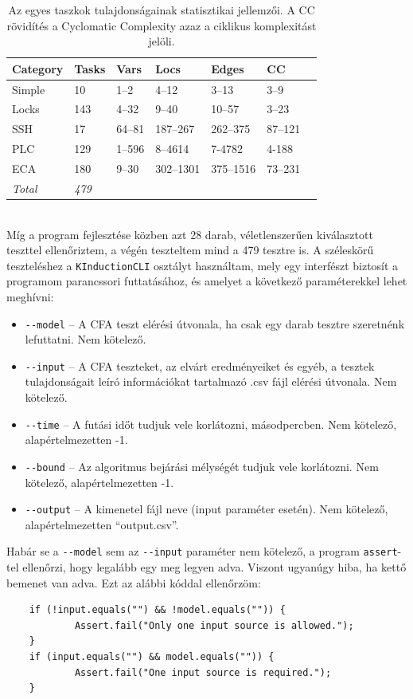 \begin{table}[h] 
	\centering
	\begin{tabular}{lllllll}
		\toprule
		Category & Tasks & Vars & Locs & Edges & CC\\
		\midrule
		Simple & 10 & 1--2 & 4--12 & 3--13 & 3--9\\
		Locks & 143 & 4--32 & 9--40 & 10--57 & 3--23\\
		SSH & 17 & 64--81 & 187--267 & 262--375 & 87--121\\
		PLC & 129 & 1--596 & 8--4614 & 7-4782 & 4-188\\
		ECA & 180 & 9--30 & 302--1301 & 375--1516 & 73--231\\
		
		\bottomrule
		\textit{Total} & \textit{479}\\
	\end{tabular}
	\caption{Az egyes taszkok tulajdonságainak statisztikai jellemzői. A CC rövidítés a Cyclomatic Complexity azaz a ciklikus komplexitást jelöli.}
	\label{table:tasksStat}
\end{table}
\ \\
Míg a program fejlesztése közben azt 28 darab, véletlenszerűen kiválasztott teszttel ellenőriztem, a végén teszteltem mind a 479 tesztre is. A széleskörű teszteléshez a \texttt{KInductionCLI} osztályt használtam, mely egy interfészt biztosít a programom parancssori futtatásához, és amelyet a következő paraméterekkel lehet meghívni:

\begin{itemize}
	\item \texttt{-{}-model} -- A CFA teszt elérési útvonala, ha csak egy darab tesztre szeretnénk lefuttatni. Nem kötelező.
	\item \texttt{-{}-input} -- A CFA teszteket, az elvárt eredményeiket és egyéb, a tesztek tulajdonságait leíró információkat tartalmazó .csv fájl elérési útvonala. Nem kötelező.
	\item \texttt{-{}-time} -- A futási időt tudjuk vele korlátozni, másodpercben. Nem kötelező, alapértelmezetten -1.
	\item \texttt{-{}-bound} -- Az algoritmus bejárási mélységét tudjuk vele korlátozni. Nem kötelező, alapértelmezetten -1.
	\item \texttt{-{}-output} -- A kimenetel fájl neve (input paraméter esetén). Nem kötelező, alapértelmezetten ``output.csv''.
\end{itemize}
Habár se a \texttt{-{}-model} sem az \texttt{-{}-input} paraméter nem kötelező, a program \texttt{assert}-tel ellenőrzi, hogy legalább egy meg legyen adva. Viszont ugyanúgy hiba, ha kettő bemenet van adva. Ezt az alábbi kóddal ellenőrzöm:
\ \\
\begin{lstlisting}
	if (!input.equals("") && !model.equals("")) {
			Assert.fail("Only one input source is allowed.");
	}
	if (input.equals("") && model.equals("")) {
			Assert.fail("One input source is required.");
	}
\end{lstlisting}

